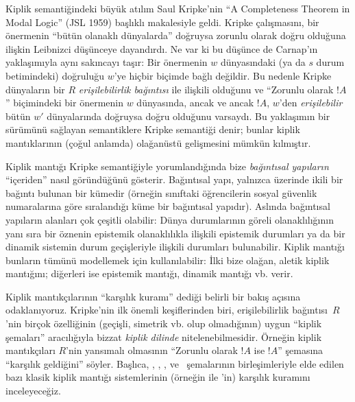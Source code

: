 \documentclass[../../../include/open-logic-section]{subfiles}
\begin{document}
Kiplik semantiğindeki büyük atılım Saul Kripke'nin ``A Completeness Theorem
in Modal Logic'' (JSL 1959) başlıklı makalesiyle geldi. Kripke çalışmasını,
bir önermenin ``bütün olanaklı dünyalarda'' doğruysa zorunlu olarak doğru
olduğuna ilişkin Leibnizci düşünceye dayandırdı. Ne var ki bu düşünce de
Carnap'ın yaklaşımıyla aynı sakıncayı taşır: Bir önermenin $w$ dünyasındaki
(ya da $s$ durum betimindeki) doğruluğu $w$'ye hiçbir biçimde bağlı değildir.
Bu nedenle Kripke dünyaların bir $R$ \emph{erişilebilirlik bağıntısı} ile
ilişkili olduğunu ve ``Zorunlu olarak $!A$'' biçimindeki bir önermenin
$w$ dünyasında, ancak ve ancak $!A$, $w$'den \emph{erişilebilir} bütün
$w'$ dünyalarında doğruysa doğru olduğunu varsaydı. Bu yaklaşımın bir
sürümünü sağlayan semantiklere Kripke semantiği denir; bunlar kiplik
mantıklarının (çoğul anlamda) olağanüstü gelişmesini mümkün kılmıştır.

Kiplik mantığı Kripke semantiğiyle yorumlandığında bize \emph{bağıntısal
yapıların} ``içeriden'' nasıl göründüğünü gösterir. Bağıntısal yapı, yalnızca
üzerinde ikili bir bağıntı bulunan bir kümedir (örneğin sınıftaki öğrencilerin
sosyal güvenlik numaralarına göre sıralandığı küme bir bağıntısal yapıdır).
Aslında bağıntısal yapıların alanları çok çeşitli olabilir: Dünya
durumlarının göreli olanaklılığının yanı sıra bir öznenin epistemik
olanaklılıkla ilişkili epistemik durumları ya da bir dinamik sistemin durum
geçişleriyle ilişkili durumları bulunabilir. Kiplik mantığı bunların tümünü
modellemek için kullanılabilir: İlki bize olağan, aletik kiplik mantığını;
diğerleri ise epistemik mantığı, dinamik mantığı vb. verir.

Kiplik mantıkçılarının ``karşılık kuramı'' dediği belirli bir bakış açısına
odaklanıyoruz. Kripke'nin ilk önemli keşiflerinden biri, erişilebilirlik
bağıntısı~$R$'nin birçok özelliğinin (geçişli, simetrik vb. olup olmadığının)
uygun ``kiplik şemaları'' aracılığıyla bizzat \emph{kiplik dilinde}
nitelenebilmesidir. Örneğin kiplik mantıkçıları $R$'nin yansımalı olmasının
``Zorunlu olarak $!A$ ise $!A$'' şemasına ``karşılık geldiğini'' söyler.
Başlıca, , , ,  ve~ şemalarının
birleşimleriyle elde edilen bazı klasik kiplik mantığı sistemlerinin
(örneğin  ile 'in) karşılık kuramını inceleyeceğiz.
\end{document}
